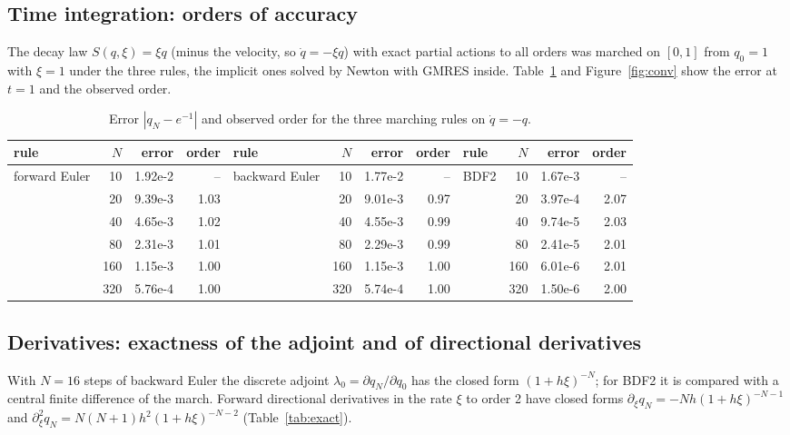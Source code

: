 \documentclass[11pt,a4paper]{article}
\begin{document}
\subsection{Time integration: orders of accuracy}

The decay law $S(q,\xi)=\xi q$ (minus the velocity, so $\dot q=-\xi q$) with exact partial actions to all orders was marched on $[0,1]$ from $q_0=1$ with $\xi=1$ under the three rules, the implicit ones solved by Newton with GMRES inside. Table~\ref{tab:orders} and Figure~\ref{fig:conv} show the error at $t=1$ and the observed order.

\begin{table}[H]
\centering\footnotesize
\begin{tabular}{@{}lrrr|lrrr|lrrr@{}}
\toprule
rule & $N$ & error & order & rule & $N$ & error & order & rule & $N$ & error & order \\
\midrule
forward Euler & 10 & 1.92e-2 & -- & backward Euler & 10 & 1.77e-2 & -- & BDF2 & 10 & 1.67e-3 & -- \\
& 20 & 9.39e-3 & 1.03 & & 20 & 9.01e-3 & 0.97 & & 20 & 3.97e-4 & 2.07 \\
& 40 & 4.65e-3 & 1.02 & & 40 & 4.55e-3 & 0.99 & & 40 & 9.74e-5 & 2.03 \\
& 80 & 2.31e-3 & 1.01 & & 80 & 2.29e-3 & 0.99 & & 80 & 2.41e-5 & 2.01 \\
& 160 & 1.15e-3 & 1.00 & & 160 & 1.15e-3 & 1.00 & & 160 & 6.01e-6 & 2.01 \\
& 320 & 5.76e-4 & 1.00 & & 320 & 5.74e-4 & 1.00 & & 320 & 1.50e-6 & 2.00 \\
\bottomrule
\end{tabular}
\caption{Error $|q_N - e^{-1}|$ and observed order for the three marching rules on $\dot q = -q$.}
\label{tab:orders}
\end{table}

\subsection{Derivatives: exactness of the adjoint and of directional derivatives}

With $N=16$ steps of backward Euler the discrete adjoint $\lambda_0 = \partial q_N/\partial q_0$ has the closed form $(1+h\xi)^{-N}$; for BDF2 it is compared with a central finite difference of the march. Forward directional derivatives in the rate $\xi$ to order 2 have closed forms $\partial_\xi q_N = -Nh(1+h\xi)^{-N-1}$ and $\partial_\xi^2 q_N = N(N+1)h^2(1+h\xi)^{-N-2}$ (Table~\ref{tab:exact}).
\end{document}
